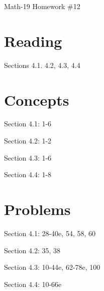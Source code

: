 \documentclass[letterpaper,12pt,fleqn]{article}
\begin{document}
\begin{center}
\Large Math-19 Homework \#12
\end{center}

\section*{Reading}

Sections 4.1. 4.2, 4.3, 4.4

\section*{Concepts}

Section 4.1: 1-6

Section 4.2: 1-2

Section 4.3: 1-6

Section 4.4: 1-8

\section*{Problems}

Section 4.1: 28-40e, 54, 58, 60

Section 4.2: 35, 38

Section 4.3: 10-44e, 62-78e, 100

Section 4.4: 10-66e
\end{document}
